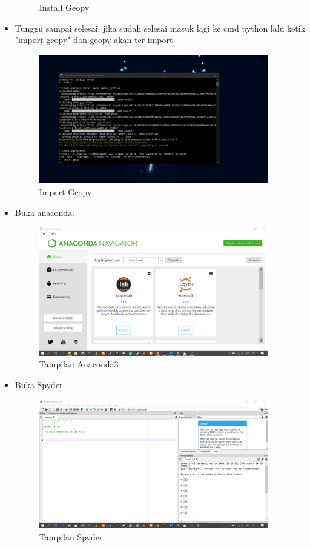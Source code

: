 \documentclass{article}
\begin{document}
\begin{itemize}
\begin{figure}[!htbp]
	\caption{Install Geopy}
\end{figure}
\item Tunggu sampai selesai, jika sudah selesai masuk lagi ke cmd python lalu ketik "import geopy" dan geopy akan ter-import.
\begin{figure}[!htbp]
	\centering
	\includegraphics[width=10cm]{figures/conda4.png}
	\caption{Import Geopy}
\end{figure}
\item Buka anaconda.
\begin{figure}[!htbp]
	\centering
	\includegraphics[width=10cm]{figures/conda5.png}
	\caption{Tampilan Anaconda3}
\end{figure}
\item Buka Spyder.
\begin{figure}[!htbp]
	\centering
	\includegraphics[width=10cm]{figures/conda6.png}
	\caption{Tampilan Spyder}
\end{figure}
\end{itemize}
\end{document}

